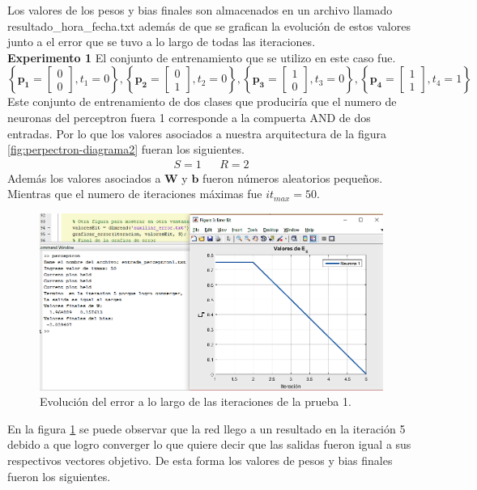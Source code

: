 \documentclass[12pt, titlepage]{article}
\begin{document}
Los valores de los pesos y bias finales son almacenados en un archivo llamado resultado\_hora\_fecha.txt además de que se grafican la evolución de estos valores junto a el error que se tuvo a lo largo de todas las iteraciones.
\\
\textbf{Experimento 1}
El conjunto de entrenamiento que se utilizo en este caso fue.
\[ \left\lbrace \boldsymbol{p_1} = \left[\begin{array}{c} 0\\ 0\end{array}\right], t_1 = 0  \right\rbrace, \left\lbrace \boldsymbol{p_2} = \left[\begin{array}{c} 0\\ 1\end{array}\right], t_2 = 0  \right\rbrace, \left\lbrace \boldsymbol{p_3} = \left[\begin{array}{c} 1\\ 0\end{array}\right], t_3 = 0  \right\rbrace, \left\lbrace \boldsymbol{p_4} = \left[\begin{array}{c} 1\\ 1\end{array}\right], t_4 = 1  \right\rbrace  \]
Este conjunto de entrenamiento de dos clases que produciría que el numero de neuronas del perceptron fuera 1 corresponde a la compuerta AND de dos entradas. Por lo que los valores asociados a nuestra arquitectura de la figura \ref{fig:perpectron-diagrama2} fueran los siguientes.
\begin{align*}
S=1 && R=2
\end{align*}
Además los valores asociados a $\boldsymbol{W}$ y $\boldsymbol{b}$ fueron números aleatorios pequeños. Mientras que el numero de iteraciones máximas fue $it_{max}=50$.
\begin{figure}[H]
    \begin{center}
        \includegraphics[width=15cm]{img/perceptron1/error.png}
        \caption{Evolución del error a lo largo de las iteraciones de la prueba 1.}
        \label{fig:error1}
    \end{center}
\end{figure}
En la figura \ref{fig:error1} se puede observar que la red llego a un resultado en la iteración 5 debido a que logro converger lo que quiere decir que las salidas fueron igual a sus respectivos vectores objetivo. De esta forma los valores de pesos y bias finales fueron los siguientes.
\end{document}
